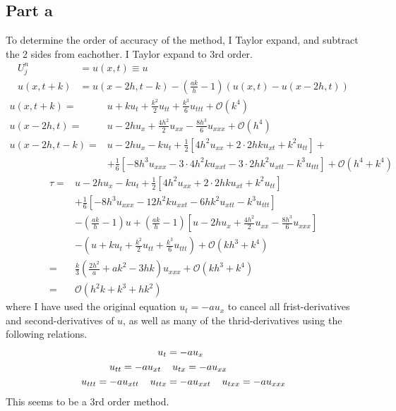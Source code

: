 \documentclass[aps, 12pt]{revtex4}
\begin{document}
\subsection*{Part a}
To determine the order of accuracy of the method, I Taylor expand, and subtract the 2 sides from eachother. I Taylor expand to 3rd order.
\begin{align*}
    U_j^n     & = u(x, t)  \equiv u
    \\
    u(x, t+k) & = u(x-2h, t-k)-\left(\frac{ak}{h}-1\right)(u(x,t)-u(x-2h,t))
\end{align*}
\begin{align*}
    u(x, t+k)     = & u +ku_t + \frac{k^2}{2}u_{tt}+\frac{k^3}{6}u_{ttt} + \mathcal{O}(k^4)
    \\
    u(x-2h, t)   =  & u-2hu_x + \frac{4h^2}{2}u_{xx} - \frac{8h^3}{6}u_{xxx} + \mathcal{O}(h^4)
    \\
    u(x-2h, t-k) =  & u - 2hu_x - ku_t + \frac{1}{2}\left[4h^2u_{xx} + 2\cdot 2hku_{xt}+k^2u_{tt} \right] +
    \\
                    & + \frac{1}{6}\left[-8h^3u_{xxx}-3\cdot4h^2ku_{xxt}-3\cdot2hk^2u_{xtt}-k^3u_{ttt} \right] + \mathcal{O}(h^4+k^4)
\end{align*}
\begin{align*}
    \tau = & u - 2hu_x - ku_t + \frac{1}{2}\left[4h^2u_{xx} + 2\cdot 2hku_{xt}+k^2u_{tt} \right] \\&+ \frac{1}{6}\left[-8h^3u_{xxx}-12h^2ku_{xxt}-6hk^2u_{xtt}-k^3u_{ttt} \right] \\ &- \left(\frac{ak}{h}-1\right)u + \left(\frac{ak}{h}-1\right)\left[u-2hu_x + \frac{4h^2}{2}u_{xx} - \frac{8h^3}{6}u_{xxx} \right] \\ & - \left(u +ku_t + \frac{k^2}{2}u_{tt}+\frac{k^3}{6}u_{ttt}\right) + \mathcal{O}(kh^3+k^4)
    \\
    =      & \frac{k}{3}\left(\frac{2h^2}{a} + ak^2 - 3hk\right)u_{xxx} + \mathcal{O}(kh^3+k^4)
    \\
    =      & \mathcal{O}(h^2k + k^3 + hk^2)
\end{align*}
where I have used the original equation $u_t=-au_x$ to cancel all frist-derivatives and second-derivatives of $u$, as well as many of the thrid-derivatives using the following relations.
\begin{align*}
    u_t                                       & = -au_x
    \\
    u_{tt} = -au_{xt} \hspace{2mm}            & \hspace{2mm} u_{tx}   = -au_{xx}
    \\
    u_{ttt}  = -au_{xtt} \hspace{4mm} u_{ttx} & = -au_{xxt} \hspace{4mm} u_{txx} = -au_{xxx}
\end{align*}
This seems to be a 3rd order method.
\end{document}

